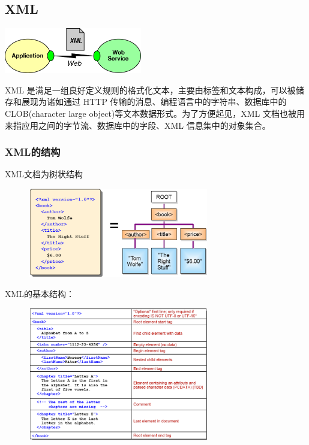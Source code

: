 \subsection{XML}
\begin{table}
    \centering
    \vspace{-1.5em}
    \includegraphics[width=6cm]{images/XML.png}
    \vspace{-1.5em}
\end{table}
XML 是满足一组良好定义规则的格式化文本，主要由标签和文本构成，可以被储存和展现为诸如通过 HTTP 传输的消息、编程语言中的字符串、数据库中的 CLOB(character large object)等文本数据形式。为了方便起见，XML 文档也被用来指应用之间的字节流、数据库中的字段、XML 信息集中的对象集合。

\subsubsection{XML的结构}
XML文档为树状结构
\begin{figure}[H]
    \vspace{-0.5em}
	\centering
	\includegraphics[width=0.7\textwidth]{images/XML文档的树状结构.png}
    \vspace{-1em}
\end{figure}

XML的基本结构：
\begin{figure}[H]
    \vspace{-0.5em}
	\centering
	\includegraphics[width=0.7\textwidth]{images/XML的基本结构.png}
    \vspace{-1em}
\end{figure}


